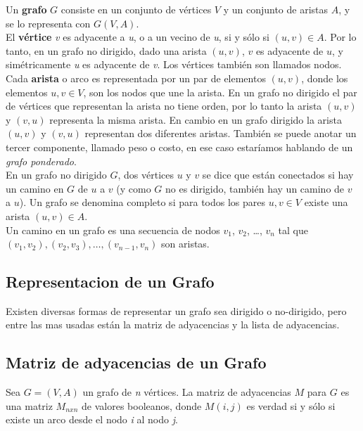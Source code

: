       Un \textbf{grafo} $G$ consiste en un conjunto de vértices $V$ y un conjunto de aristas $A$, y se lo representa con $G(V,A)$.\\

      El \textbf{vértice} \emph{v} es adyacente a \emph{u}, o a un vecino de \emph{u}, si y sólo si $(u,v) \in A$. Por lo tanto, en un grafo no dirigido, dado una arista $(u,v)$, $v$ es adyacente de $u$, y simétricamente \emph{u} es adyacente de \emph{v}.
      Los vértices también son llamados nodos. \\

      Cada \textbf{arista} o arco es representada por un par de elementos $(u,v)$, donde los elementos $u,v \in V$, son los nodos que une la arista.
      En un grafo no dirigido el par de vértices que representan la arista no tiene orden, por lo tanto la arista $(u,v)$ y $(v,u)$ representa la misma arista. En cambio en un grafo dirigido la arista $(u,v)$ y $(v,u)$ representan dos diferentes aristas. También se puede anotar un tercer componente, llamado peso o costo, en ese caso estaríamos hablando de un \emph{grafo ponderado}.\\

      En un grafo no dirigido $G$, dos vértices $u$ y $v$ se dice que están conectados si hay un camino en $G$ de $u$ a $v$ (y como $G$ no es dirigido, también hay un camino de $v$ a $u$). Un grafo  se denomina completo si para todos los pares $u,v \in V$ existe una arista $(u,v) \in A$.\\

      Un camino en un grafo es una secuencia de nodos $v_{1}$, $v_{2}$, \ldots{}, $v_n$ tal que $(v_{1}, v_{2}), (v_{2}, v_{3}), \ldots{}, (v_{n-1}, v_n)$ son aristas.
    \subsection{Representacion de un Grafo} %
    \label{sub:representacion_de_un_grafo}
      Existen diversas formas de representar un grafo sea dirigido o no-dirigido, pero entre las mas usadas están la matriz de adyacencias y la lista de adyacencias.

      \subsection{Matriz de adyacencias de un Grafo} %
      \label{sub:matriz_de_adyacencias_de_un_grafo}
        Sea $G = (V,A)$ un grafo de \emph{n} vértices. La matriz de adyacencias $M$  para $G$ es una matriz $M_{nxn}$ de valores booleanos, donde $M(i,j)$ es verdad si y sólo si existe un arco desde el nodo \emph{i} al nodo \emph{j}.

